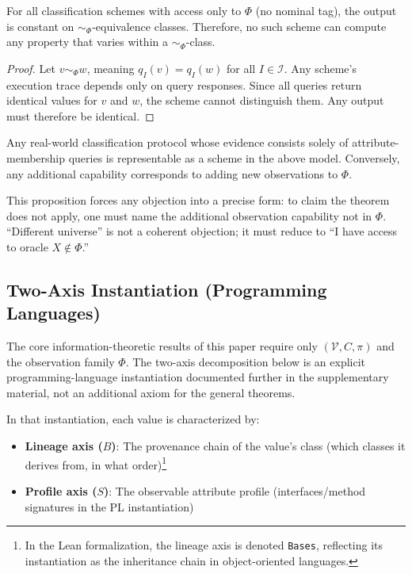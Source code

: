 \begin{theorem}\label{thm:info-barrier}
For all classification schemes with access only to $\Phi$ (no nominal tag), the output is constant on $\sim_\Phi$-equivalence classes. Therefore, no such scheme can compute any property that varies within a $\sim_\Phi$-class.
\end{theorem}

\begin{proof}
Let $v \sim_\Phi w$, meaning $q_I(v) = q_I(w)$ for all $I \in \mathcal{I}$. Any scheme's execution trace depends only on query responses. Since all queries return identical values for $v$ and $w$, the scheme cannot distinguish them. Any output must therefore be identical.
\end{proof}

\begin{proposition}\label{prop:model-capture}
Any real-world classification protocol whose evidence consists solely of attribute-membership queries is representable as a scheme in the above model. Conversely, any additional capability corresponds to adding new observations to $\Phi$.
\end{proposition}

This proposition forces any objection into a precise form: to claim the theorem does not apply, one must name the additional observation capability not in $\Phi$. ``Different universe'' is not a coherent objection; it must reduce to ``I have access to oracle $X \notin \Phi$.''

\subsection{Two-Axis Instantiation (Programming Languages)}

The core information-theoretic results of this paper require only $(\mathcal{V}, C, \pi)$ and the observation family $\Phi$. The two-axis decomposition below is an explicit programming-language instantiation documented further in the supplementary material, not an additional axiom for the general theorems.

In that instantiation, each value is characterized by:
\begin{itemize}
\item \textbf{Lineage axis ($B$)}: The provenance chain of the value's class (which classes it derives from, in what order)\footnote{In the Lean formalization, the lineage axis is denoted \texttt{Bases}, reflecting its instantiation as the inheritance chain in object-oriented languages.}
\item \textbf{Profile axis ($S$)}: The observable attribute profile (interfaces/method signatures in the PL instantiation)
\end{itemize}

